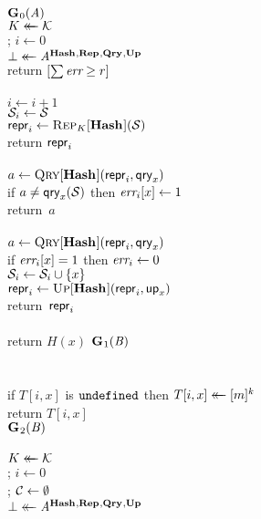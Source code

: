 \begin{figure*}
  {
    \underline{$\game_0(\advA)$}\\[2pt]
      $\key \getsr \keys$\\; $i \gets 0$\\
      $\bot \getsr \advA^{\HASHO,\REPO,\QRYO,\UPO}$\\
      return $[\sum \err \geq r]$
    \\[6pt]
    \oraclev{$\REPO(\col)$}\\[2pt]
      $i \gets i + 1$\\
      $\col_i \gets \col$\\
      $\pub_i \gets \Rep_K[\HASHO](\col)$\\
      return $\pub_i$
    \\[6pt]
    \\[2pt]
      $a \gets \Qry[\HASHO](\pub_i, \qry_x)$\\
      if $a \neq \qry_x(\col)$ then $\err_i[x] \gets 1$\\
      return~$a$
    \\[6pt]
    \\[2pt]
      $a \gets \Qry[\HASHO](\pub_i, \qry_x)$\\
      if $\err_i[x] = 1$ then $\err_i \gets 0$\\
      $\col_i \gets \col_i \union \{x\}$\\
      $\pub_i \gets \Up[\HASHO](\pub_i,\up_x)$\\
      return~$\pub_i$
    \\[4pt]
    \\[2pt]
      return $H(x)$
  }
  {
  \underline{$\game_1(\advB)$}\\[2pt]\\
    \\
      if $T[i, x]$ is $\undefn$ then $T[i, x] \getsr [m]^k$\\
      return $T[i, x]$
    \\[6pt]
    \underline{$\game_2(\advB)$}\\[2pt]\\
      $\key \getsr \keys$\\; $i \gets 0$\\; $\setC \gets \emptyset$\\
      $\bot \getsr \advA^{\HASHO,\REPO,\QRYO,\UPO}$\\
}
\end{figure*}
